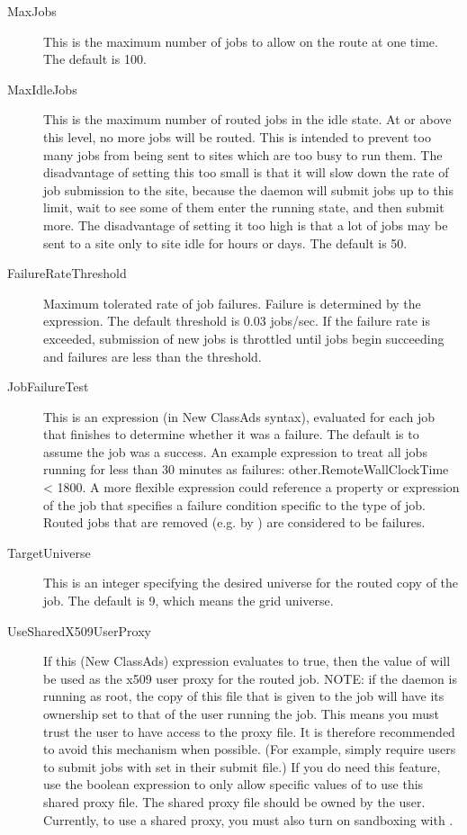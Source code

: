 \begin{description}
\begin{description}
\item[MaxJobs] This is the maximum number of jobs to allow on the route at
one time. The default is 100.

\item[MaxIdleJobs] This is the maximum number of routed jobs in the
idle state.  At or above this level, no more jobs will be routed.
This is intended to prevent too many jobs from being sent to sites
which are too busy to run them.  The disadvantage of setting this too
small is that it will slow down the rate of job submission to the
site, because the  daemon will submit jobs up to this limit, wait to see
some of them enter the running state, and then submit more.  The
disadvantage of setting it too high is that a lot of jobs may be sent
to a site only to site idle for hours or days.  The default is 50.

\item[FailureRateThreshold] Maximum tolerated rate of job failures.
Failure is determined by the  expression.  The
default threshold is 0.03 jobs/sec.  If the failure rate is exceeded,
submission of new jobs is throttled until jobs begin succeeding and
failures are less than the threshold.

\item[JobFailureTest] This is an expression (in New ClassAds syntax),
evaluated for each job that finishes to determine whether it was a
failure.  The default is to assume the job was a success.  An example
expression to treat all jobs running for less than 30 minutes as
failures: other.RemoteWallClockTime < 1800.  A more flexible
expression could reference a property or expression of the job that
specifies a failure condition specific to the type of job.  Routed
jobs that are removed (e.g. by ) are considered
to be failures.

\item[TargetUniverse] This is an integer specifying the desired
universe for the routed copy of the job.  The default is 9, which
means the grid universe.

\item[UseSharedX509UserProxy] If this (New ClassAds) expression
evaluates to true, then the value of  will
be used as the x509 user proxy for the routed job.  NOTE: if the  daemon
is running as root, the copy of this file that is given to the job
will have its ownership set to that of the user running the job.  This
means you must trust the user to have access to the proxy file.  It is
therefore recommended to avoid this mechanism when possible.  (For
example, simply require users to submit jobs with 
set in their submit file.)  If you do need this feature, use the
boolean expression to only allow specific values of 
to use this shared proxy file.  The shared proxy file should be owned
by the  user.  Currently, to use a shared proxy, you must also
turn on sandboxing with .


\end{description}
\end{description}
